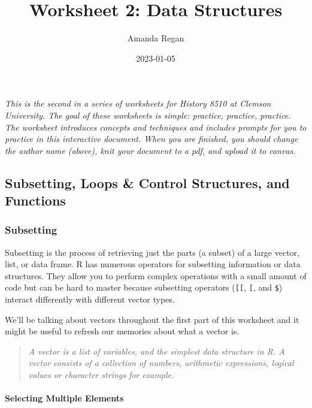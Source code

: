 \documentclass[
]{article}
\title{Worksheet 2: Data Structures}
\author{Amanda Regan}
\date{2023-01-05}
\begin{document}
\maketitle

\emph{This is the second in a series of worksheets for History 8510 at
Clemson University. The goal of these worksheets is simple: practice,
practice, practice. The worksheet introduces concepts and techniques and
includes prompts for you to practice in this interactive document. When
you are finished, you should change the author name (above), knit your
document to a pdf, and upload it to canvas.}

\hypertarget{subsetting-loops-control-structures-and-functions}{%
\subsection{Subsetting, Loops \& Control Structures, and
Functions}\label{subsetting-loops-control-structures-and-functions}}

\hypertarget{subsetting}{%
\subsubsection{Subsetting}\label{subsetting}}

Subsetting is the process of retrieving just the parts (a subset) of a
large vector, list, or data frame. R has numerous operators for
subsetting information or data structures. They allow you to perform
complex operations with a small amount of code but can be hard to master
because subsetting operators (\texttt{{[}{[}}, \texttt{{[}}, and
\texttt{\$}) interact differently with different vector types.

We'll be talking about vectors throughout the first part of this
worksheet and it might be useful to refresh our memories about what a
vector is.

\begin{quote}
\emph{A vector is a list of variables, and the simplest data structure
in R. A vector consists of a collection of numbers, arithmetic
expressions, logical values or character strings for example.}
\end{quote}

\hypertarget{selecting-multiple-elements}{%
\paragraph{Selecting Multiple
Elements}\label{selecting-multiple-elements}}
\end{document}
